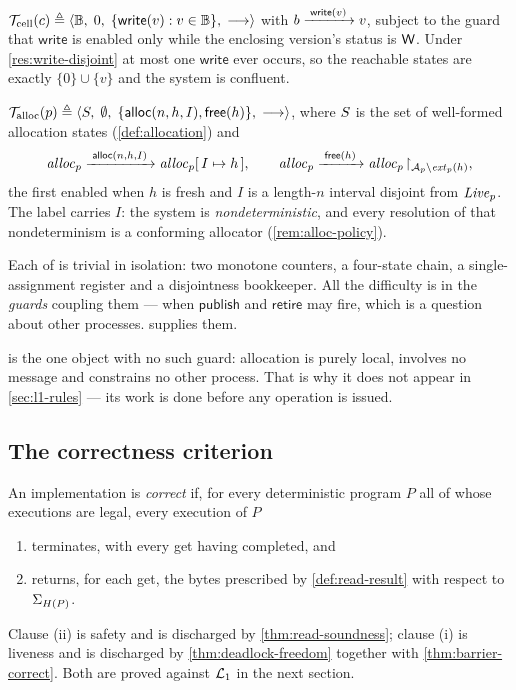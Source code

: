 \begin{definition}[Cell]\label{ts:cell}
$\mathcal{T}_{\mathrm{cell}}(c) \triangleq \langle \mathbb{B},\; 0,\;
 \{\mathsf{write}(v) : v \in \mathbb{B}\},\; \longrightarrow \rangle$ with
$b \xrightarrow{\;\mathsf{write}(v)\;} v$, subject to the guard that
$\mathsf{write}$ is enabled only while the enclosing version's status is
$\mathsf{W}$. Under \cref{res:write-disjoint} at most one $\mathsf{write}$ ever
occurs, so the reachable states are exactly $\{0\} \cup \{v\}$ and the
system is confluent.
\end{definition}

\begin{definition}[Allocation]\label{ts:alloc}
$\mathcal{T}_{\mathrm{alloc}}(p) \triangleq \langle S,\; \emptyset,\;
 \{\mathsf{alloc}(n,h,I), \mathsf{free}(h)\},\; \longrightarrow \rangle$, where
$S$ is the set of well-formed allocation states
(\cref{def:allocation}) and
\[
  \mathit{alloc}_{p} \xrightarrow{\;\mathsf{alloc}(n,h,I)\;} \mathit{alloc}_{p}[\,I \mapsto h\,],
  \qquad
  \mathit{alloc}_{p} \xrightarrow{\;\mathsf{free}(h)\;} \mathit{alloc}_{p}\!\restriction_{\mathcal{A}_{p}
    \setminus \mathit{ext}_{p}(h)},
\]
the first enabled when $h$ is fresh and $I$ is a length-$n$ interval disjoint
from $\mathit{Live}_{p}$. The label carries $I$: the system is \emph{nondeterministic},
and every resolution of that nondeterminism is a conforming allocator
(\cref{rem:alloc-policy}).
\end{definition}

\begin{remark}
Each of  is trivial in isolation: two monotone
counters, a four-state chain, a single-assignment register and a disjointness
bookkeeper. All the difficulty is in the \emph{guards} coupling them --- when
$\mathsf{publish}$ and $\mathsf{retire}$ may fire, which is a question about
other processes.  supplies them.
\end{remark}

 is the one object with no such guard: allocation is purely
local, involves no message and constrains no other process. That is why it
does not appear in \cref{sec:l1-rules} --- its work is done before any
operation is issued.

\subsection{The correctness criterion}
\label{sec:l0-correctness}

\begin{definition}\label{def:correctness}
An implementation is \emph{correct} if, for every deterministic program $P$
all of whose executions are legal, every execution of $P$
\begin{enumerate}[label=(\roman*),leftmargin=1.4cm]
  \item terminates, with every get having completed, and
  \item returns, for each get, the bytes prescribed by
    \cref{def:read-result} with respect to $\Sigma_{H(P)}$.
\end{enumerate}
\end{definition}

Clause (ii) is safety and is discharged by \cref{thm:read-soundness}; clause
(i) is liveness and is discharged by \cref{thm:deadlock-freedom} together with
\cref{thm:barrier-correct}. Both are proved against $\mathcal{L}_1$ in the next
section.
